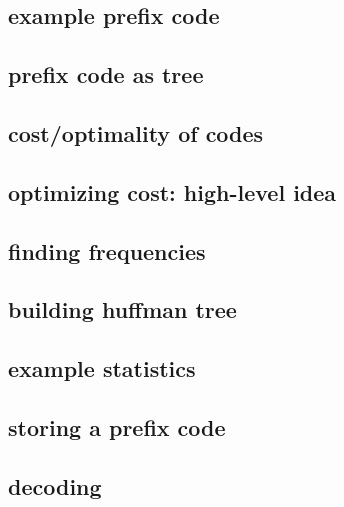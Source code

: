 \subsection{example prefix code}

\subsection{prefix code as tree}

\subsection{cost/optimality of codes}

\subsection{optimizing cost: high-level idea}


\subsection{finding frequencies}


\subsection{building huffman tree}



\subsection{example statistics}

\subsection{storing a prefix code}

\subsection{decoding}

